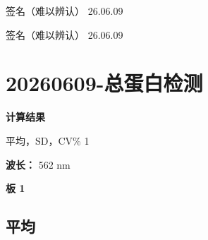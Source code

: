 \documentclass[UTF8,10pt,a4paper,fontset=fandol]{ctexart}
\newcommand{\handwritten}[1]{#1}
\begin{document}
\vfill

\begin{flushright}
\handwritten{签名（难以辨认）}\quad
\handwritten{26.06.09}

\vspace{1em}

\handwritten{签名（难以辨认）}\quad
\handwritten{26.06.09}
\end{flushright}

\newpage

\section*{20260609-总蛋白检测}

\textbf{计算结果}

平均，SD，CV\% 1

\textbf{波长：} 562 nm

\textbf{板 1}

\subsection*{平均}
\end{document}
